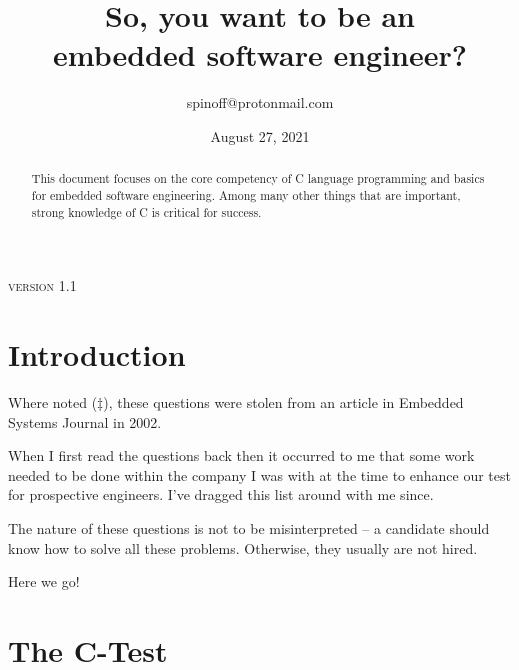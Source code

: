 \documentclass[12pt]{article}
\author{spinoff@protonmail.com}
\date{August 27, 2021}
\title{So, you want to be an \\embedded software engineer?}
\begin{document}
\begin{titlingpage}
\maketitle
\begin{abstract}
This document focuses on the core
competency of C language programming and basics for 
embedded software engineering.  Among many other things
that are important, strong knowledge of C is critical for
success.
\end{abstract}
\par
\vskip1cm
{\textsc{version 1.1}}
\vskip5mm

\end{titlingpage}

\section{Introduction}

Where noted ($\ddagger$), these questions were stolen from an article
in Embedded Systems Journal in 2002.

When I first read the questions back then it occurred to me that some work needed to be
done within the company I was with at the time to enhance our test for prospective 
engineers.  I've dragged this list around with me since.

The nature of these questions is not to be misinterpreted -- a candidate should know
how to solve all these problems. Otherwise, they usually are not hired.

Here we go! 

\section{The C-Test}
\end{document}

